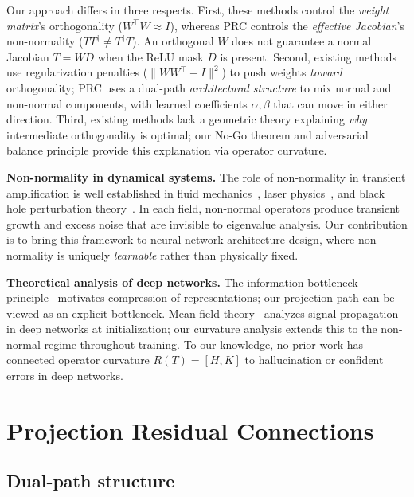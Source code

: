 \documentclass[11pt,a4paper]{article}
\theoremstyle{definition}
\begin{document}
Our approach differs in three respects.
First, these methods control the \emph{weight matrix}'s
orthogonality ($W^\top W \approx I$), whereas PRC controls the
\emph{effective Jacobian}'s non-normality ($TT^\dagger \neq T^\dagger T$).
An orthogonal $W$ does not guarantee a normal Jacobian $T = WD$
when the ReLU mask $D$ is present.
Second, existing methods use regularization penalties
($\|WW^\top - I\|^2$) to push weights \emph{toward} orthogonality;
PRC uses a dual-path \emph{architectural structure} to mix normal
and non-normal components, with learned coefficients $\alpha, \beta$
that can move in either direction.
Third, existing methods lack a geometric theory explaining
\emph{why} intermediate orthogonality is optimal; our No-Go theorem
and adversarial balance principle provide this explanation via
operator curvature.

\textbf{Non-normality in dynamical systems.}
The role of non-normality in transient amplification is well
established in fluid mechanics~\cite{trefethen1993,schmid2007},
laser physics~\cite{petermann1979,siegman1989a,berry2003}, and
black hole perturbation theory~\cite{jaramillo2021}.
In each field, non-normal operators produce transient growth and
excess noise that are invisible to eigenvalue analysis. Our
contribution is to bring this framework to neural network
architecture design, where non-normality is uniquely
\emph{learnable} rather than physically fixed.

\textbf{Theoretical analysis of deep networks.}
The information bottleneck principle~\cite{tishby2015} motivates
compression of representations; our projection path can be viewed
as an explicit bottleneck. Mean-field
theory~\cite{poole2016meanfield} analyzes signal propagation in
deep networks at initialization; our curvature analysis extends
this to the non-normal regime throughout training. To our knowledge,
no prior work has connected operator curvature $R(T) = [H,K]$ to
hallucination or confident errors in deep networks.

\section{Projection Residual Connections}
\label{sec:prc}

\subsection{Dual-path structure}
\end{document}
